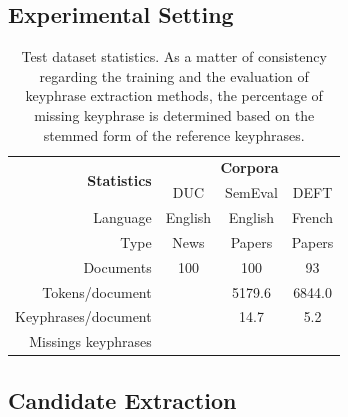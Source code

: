   \subsection{Experimental Setting}
  \label{subsec:experimental_setting}
    \begin{table}
      \centering
      \begin{tabular}{rccc}
        \toprule
        \multirow{2}{*}[-2pt]{\textbf{Statistics}} & \multicolumn{3}{c}{\textbf{Corpora}}\\
        \cmidrule{2-4}
        & DUC & SemEval & DEFT\\
        \midrule
        Language & English & English & French\\
        Type & News & Papers & Papers\\
        Documents & 100 & 100 & 93\\
        Tokens/document & & 5179.6 & 6844.0\\
        Keyphrases/document & & 14.7 & 5.2\\
        Missings keyphrases & & & \\
        \bottomrule
      \end{tabular}
      \caption{Test dataset statistics. As a matter of consistency regarding
               the training and the evaluation of keyphrase extraction methods,
               the percentage of missing keyphrase is determined based on the
               stemmed form of the reference keyphrases.
               \label{tab:dataset_statistics}}
    \end{table}

  \subsection{Candidate Extraction}
  \label{subsec:candidate_extraction}


